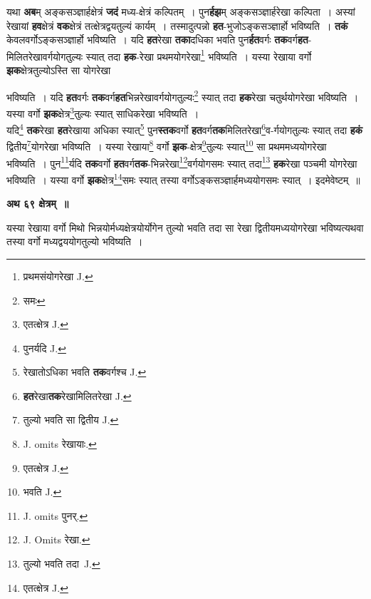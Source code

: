 \documentclass[11pt, openany]{book}
\begin{document}
 यथा \textbf{अब}म् अङ्कसञ्ज्ञार्हक्षेत्रं \textbf{जदं} मध्य-क्षेत्रं कल्पितम्~। पुन\textbf{र्हझ}म् अङ्कसञ्ज्ञार्हरेखा कल्पिता~। अस्यां रेखायां \textbf{हव}क्षेत्रं \textbf{वक}क्षेत्रं तत्क्षेत्रद्वयतुल्यं कार्यम्~। तस्मादुत्पन्नो \textbf{हत}-भुजोऽङ्कसञ्ज्ञार्हो भविष्यति~। \textbf{तकं} केवलवर्गोऽङ्कसञ्ज्ञार्हो भविष्यति~। यदि \textbf{हत}रेखा \textbf{तका}दधिका भवति पुन\textbf{र्हत}वर्गः \textbf{तक}वर्ग\textbf{हत}-मिलितरेखावर्गयोगतुल्यः स्यात् तदा \textbf{हक}-रेखा प्रथमयोगरेखा\renewcommand{\thefootnote}{३}\footnote{प्रथमसंयोगरेखा {\en J.}} भविष्यति~। यस्या रेखाया वर्गो \textbf{झक}क्षेत्रतुल्योऽस्ति सा योगरेखा 

\newpage
\noindent भविष्यति~। यदि \textbf{हत}वर्गः \textbf{तक}वर्ग\textbf{हत}भिन्नरेखावर्गयोगतुल्यः\renewcommand{\thefootnote}{१}\footnote{समः} स्यात् तदा \textbf{हक}रेखा चतुर्थयोगरेखा भविष्यति~। यस्या वर्गो \textbf{झक}क्षेत्र\renewcommand{\thefootnote}{२}\footnote{एतत्क्षेत्र {\en J.}}तुल्यः स्यात् साधिकरेखा भविष्यति~। \\

 यदि\renewcommand{\thefootnote}{३}\footnote{पुनर्यदि {\en J.}} \textbf{तक}रेखा \textbf{हत}रेखाया अधिका स्यात्\renewcommand{\thefootnote}{४}\footnote{रेखातोऽधिका भवति \textbf{तक}वर्गश्च {\en J.}} पुन\textbf{स्तक}वर्गो \textbf{हत}वर्ग\textbf{तक}मिलितरेखा\renewcommand{\thefootnote}{५}\footnote{\textbf{हत}रेखा\textbf{तक}रेखामिलितरेखा {\en J.}}व-र्गयोगतुल्यः स्यात् तदा \textbf{हकं} द्वितीय\renewcommand{\thefootnote}{६}\footnote{तुल्यो भवति सा द्वितीय {\en J.}}योगरेखा भविष्यति~। यस्या रेखाया\renewcommand{\thefootnote}{७}\footnote{{\en J. omits} रेखायाः.} वर्गो \textbf{झक}-क्षेत्र\renewcommand{\thefootnote}{८}\footnote{एतत्क्षेत्र {\en J.}}तुल्यः स्यात्\renewcommand{\thefootnote}{९}\footnote{भवति {\en J.}} सा प्रथममध्ययोगरेखा भविष्यति~। पुन\renewcommand{\thefootnote}{१०}\footnote{{\en J. omits} पुनर्.}र्यदि \textbf{तक}वर्गो \textbf{हत}वर्ग\textbf{तक}-भिन्नरेखा\renewcommand{\thefootnote}{११}\footnote{{\en J. Omits} रेखा.}वर्गयोगसमः स्यात् तदा\renewcommand{\thefootnote}{१२}\footnote{तुल्यो भवति तदा~{\en J.}} \textbf{हक}रेखा पञ्चमी योगरेखा भविष्यति~। यस्या वर्गो \textbf{झक}क्षेत्र\renewcommand{\thefootnote}{१३}\footnote{एतत्क्षेत्र {\en J.}}समः स्यात् तस्या वर्गोऽङ्कसञ्ज्ञार्हमध्ययोगसमः स्यात्~। इदमेवेष्टम्~॥ 
\vspace{2mm}

\begin{center}
\textbf{\large अथ ६९ क्षेत्रम्~॥}
\end{center}

{\ab यस्या रेखाया वर्गो मिथो भिन्नयोर्मध्यक्षेत्रयोर्योगेन तुल्यो भवति तदा सा रेखा द्वितीयमध्ययोगरेखा भविष्यत्यथवा तस्या वर्गो मध्यद्वययोगतुल्यो भविष्यति~।}\\
\end{document}
